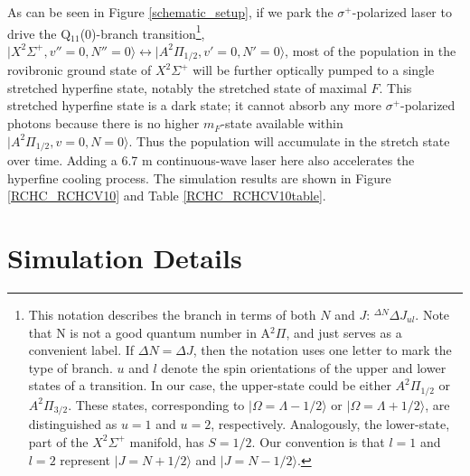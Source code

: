\documentclass[nofootinbib,aip,jcp,reprint]{revtex4-1}
\begin{document}
As can be seen in Figure \ref{schematic_setup}, if we park the $\sigma^+$-polarized laser to drive the Q$_{11}$(0)-branch transition\footnote[1]{This notation describes the branch in terms of both $N$ and $J$: $^{\Delta N}\Delta J_{ul}$. Note that N is not a good quantum number in A$^2\Pi$, and just serves as a convenient label. If $\Delta N = \Delta J$, then the notation uses one letter to mark the type of branch. $u$ and $l$ denote the spin orientations of the upper and lower states of a transition. In our case, the upper-state could be either $A^2\Pi_{1/2}$ or $A^2\Pi_{3/2}$. These states, corresponding to $\lvert \Omega=\Lambda -1/2 \rangle$ or $\lvert \Omega=\Lambda +1/2 \rangle$, are distinguished as $u=1$ and $u=2$, respectively. Analogously, the lower-state, part of the $X^2 \Sigma^{+}$ manifold, has $S=1/2$. Our convention is that $l=1$ and $l=2$ represent $\lvert J=N+1/2 \rangle$ and $\lvert J=N-1/2 \rangle$.}, $\lvert X^2\Sigma^+, v''=0, N''=0\rangle \leftrightarrow \lvert A^2\Pi_{1/2}, v'=0, N'=0\rangle$, most of the population in the rovibronic ground state of $X^2 \Sigma^{+}$ will be further optically pumped to a single stretched hyperfine state, notably the stretched state of maximal $F$. This stretched hyperfine state is a dark state; it cannot absorb any more $\sigma^+$-polarized photons because there is no higher $m_F$-state available within $\lvert A^2\Pi_{1/2}, v=0, N=0\rangle$. Thus the population will accumulate in the stretch state over time. Adding a 6.7 {\micro}m continuous-wave laser here also accelerates the hyperfine cooling process. The simulation results are shown in Figure \ref{RCHC_RCHCV10} and Table \ref{RCHC_RCHCV10table}.

\section{Simulation Details}
\end{document}

